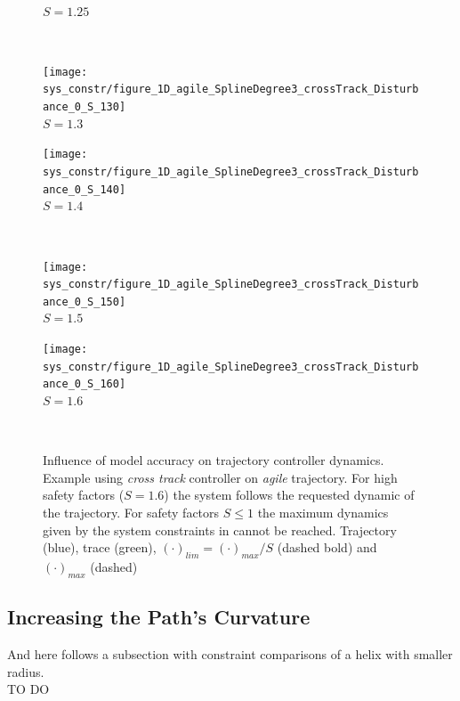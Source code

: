 \begin{figure}[h]
\begin{minipage}[t]{0.48\textwidth}
  \\ $S=1.25$
  \end{minipage}\\ \hspace{5pt}
  \begin{minipage}[t]{0.48\textwidth}
    \centering
    \texttt{[image: sys\_constr/figure\_1D\_agile\_SplineDegree3\_crossTrack\_Disturbance\_0\_S\_130]}
  \\ $S=1.3$
  \end{minipage}
  \begin{minipage}[t]{0.48\textwidth}
    \centering
    \texttt{[image: sys\_constr/figure\_1D\_agile\_SplineDegree3\_crossTrack\_Disturbance\_0\_S\_140]}
  \\ $S=1.4$
  \end{minipage}\\ \hspace{5pt}
  \begin{minipage}[t]{0.48\textwidth}
    \centering
    \texttt{[image: sys\_constr/figure\_1D\_agile\_SplineDegree3\_crossTrack\_Disturbance\_0\_S\_150]}
  \\ $S=1.5$
  \end{minipage}
  \begin{minipage}[t]{0.48\textwidth}
    \centering
    \texttt{[image: sys\_constr/figure\_1D\_agile\_SplineDegree3\_crossTrack\_Disturbance\_0\_S\_160]}
  \\ $S=1.6$
  \end{minipage} \\
  \label{fig:app_sys_constr}
  \caption{Influence of model accuracy on trajectory controller dynamics. Example using \textit{cross track} controller on \textit{agile} trajectory. For high safety factors ($S=1.6$) the system follows the requested dynamic of the trajectory. For safety factors $S\leq 1$ the maximum dynamics given by the system constraints in \cite{weichart} cannot be reached. Trajectory (blue), trace (green), $(\cdot)_{lim}=(\cdot)_{max}/S$ (dashed bold) and $(\cdot)_{max}$ (dashed)}
\end{figure}



\subsection{Increasing the Path's Curvature}
\label{sub:app_increasing_curvature}
And here follows a subsection with constraint comparisons of a helix with smaller radius.
\\
TO DO
\\


